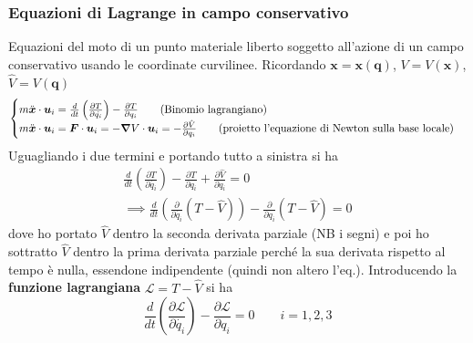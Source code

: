 \documentclass[a4paper,10pt]{article}
\theoremstyle{definition}
\newcommand{\bv}{\boldsymbol} %
\theoremstyle{indentdefinition}
\theoremstyle{indenttheorem}
\theoremstyle{myremark}
\theoremstyle{indentgeneral}
\begin{document}
\subsubsection{Equazioni di Lagrange in campo conservativo}
Equazioni del moto di un punto materiale liberto soggetto all'azione di un campo conservativo usando le coordinate curvilinee. Ricordando $\bv{x}=\bv{x}(\bv{q})$, $V=V(\bv{x})$, $\hat{V}=V(\bv{q})$
$$\begin{cases}
    m\ddot{\bv{x}}\cdot\bv{u}_i=\frac{d}{dt}\left(\frac{\partial T}{\partial \dot{q_i}}\right)-\frac{\partial T}{\partial q_i} \quad\quad \text{(Binomio lagrangiano)} \\
    m\ddot{\bv{x}}\cdot\bv{u}_i= \bv{F}\cdot{\bv{u}_i}=-\grad V\cdot {\bv{u}_i}= -\frac{\partial \hat{V}}{\partial q_i} \quad\quad\text{(proietto l'equazione di Newton sulla base locale)}
\end{cases}$$
Uguagliando i due termini e portando tutto a sinistra si ha
\begin{align*}
    \frac{d}{dt}\left(\frac{\partial T}{\partial \dot{q_i}}\right)-\frac{\partial T}{\partial q_i}+\frac{\partial \hat{V}}{\partial q_i}=0 \\
    \implies  \frac{d}{dt}\left(\frac{\partial}{\partial \dot{q_i}}(T-\hat{V})\right)-\frac{\partial}{\partial q_i}(T-\hat{V})=0
\end{align*}
dove ho portato $\hat{V}$ dentro la seconda derivata parziale (NB i  segni) e poi ho sottratto $\hat{V}$ dentro la prima derivata parziale perché la sua derivata rispetto al tempo è nulla, essendone indipendente (quindi non altero l'eq.). Introducendo la \textbf{funzione lagrangiana} $\mathcal{L}=T-\hat{V}$ si ha
$$ \frac{d}{dt}\left(\frac{\partial  \mathcal{L}}{\partial \dot{q_i}}\right)-\frac{\partial \mathcal{L}}{\partial q_i}=0 \quad\quad i=1,2,3$$
\end{document}
